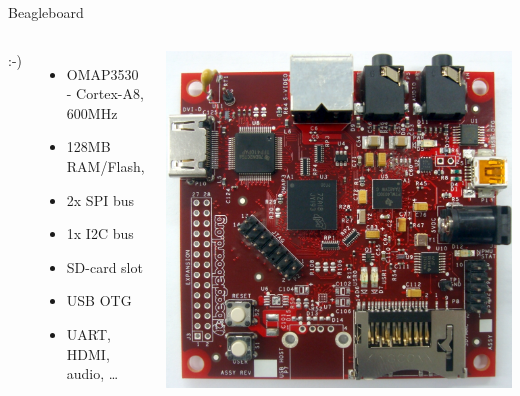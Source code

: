 \documentclass{beamer}
\begin{document}
\begin{frame}{Beagleboard}
\begin{columns}[c]

:-)
\begin{itemize}
\item OMAP3530 - Cortex-A8, 600MHz
\item 128MB RAM/Flash,
\item 2x SPI bus 
\item 1x I2C bus 
\item SD-card slot
\item USB OTG
\item UART, HDMI, audio, \ldots
\end{itemize}

\includegraphics[width=\textwidth]{../img/beagleboard}

\end{columns}
\end{frame}
\end{document}
